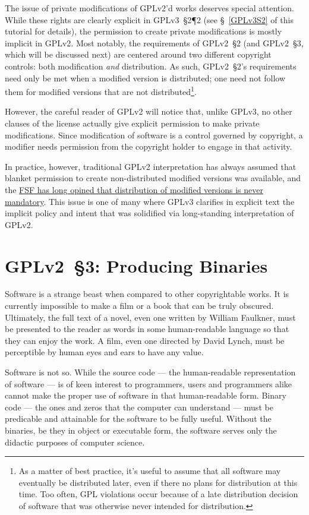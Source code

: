 The issue of private modifications of GPLv2'd works deserves special
attention.  While these rights are clearly explicit in GPLv3~\S2\P2 (see
\S~\ref{GPLv3S2} of this tutorial for details), the permission to create
private modifications is mostly implicit in GPLv2.  Most notably, the
requirements of GPLv2~\S2 (and GPLv2~\S3, which will be discussed next) are
centered around two different copyright controls: both modification
\emph{and} distribution.  As such, GPLv2~\S2's requirements need only be met
when a modified version is distributed; one need not follow them for modified
versions that are not distributed\footnote{As a matter of best practice, it's
  useful to assume that all software may eventually be distributed later,
  even if there no plans for distribution at this time.  Too often, GPL
  violations occur because of a late distribution decision of software that
  was otherwise never intended for distribution.}.

However, the careful reader of GPLv2 will notice that, unlike GPLv3, no other
clauses of the license actually give explicit permission to make private
modifications.  Since modification of software is a control governed by
copyright, a modifier needs permission from the copyright holder to engage in
that activity.

In practice, however, traditional GPLv2 interpretation has always assumed
that blanket permission to create non-distributed modified versions was
available, and the
\href{http://www.gnu.org/licenses/gpl-faq.html#GPLRequireSourcePostedPublic}{FSF
  has long opined that distribution of modified versions is never mandatory}.
This issue is one of many where GPLv3 clarifies in explicit text the implicit
policy and intent that was solidified via long-standing interpretation of
GPLv2.

\section{GPLv2~\S3: Producing Binaries}
\label{GPLv2s3}

Software is a strange beast when compared to other copyrightable works.
It is currently impossible to make a film or a book that can be truly
obscured.  Ultimately, the full text of a novel, even one written by
William Faulkner, must be presented to the reader as words in some
human-readable language so that they can enjoy the work.  A film, even one
directed by David Lynch, must be perceptible by human eyes and ears to
have any value.

Software is not so.  While the source code --- the human-readable
representation of software --- is of keen interest to programmers, users and
programmers alike cannot make the proper use of software in that
human-readable form.  Binary code --- the ones and zeros that the computer
can understand --- must be predicable and attainable for the software to
be fully useful.  Without the binaries, be they in object or executable
form, the software serves only the didactic purposes of computer science.


